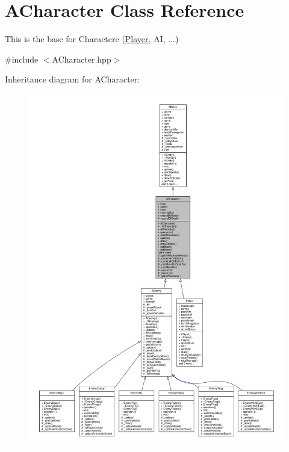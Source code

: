 \hypertarget{class_a_character}{}\section{A\+Character Class Reference}
\label{class_a_character}


This is the base for Charactere (\hyperlink{class_player}{Player}, AI, ...)  




{\ttfamily \#include $<$A\+Character.\+hpp$>$}



Inheritance diagram for A\+Character\+:
\nopagebreak
\begin{figure}[H]
\begin{center}
\leavevmode
\includegraphics[width=350pt]{class_a_character__inherit__graph}
\end{center}
\end{figure}


